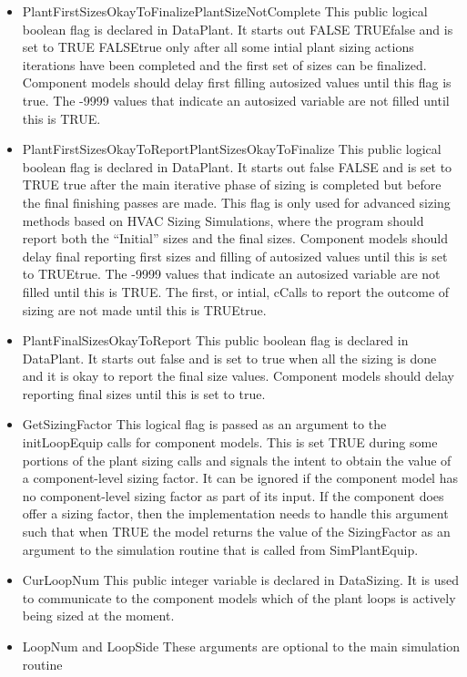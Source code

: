 \begin{itemize}
\item
  PlantFirstSizesOkayToFinalizePlantSizeNotComplete This public logical boolean flag is declared in DataPlant. It starts out FALSE TRUEfalse and is set to TRUE FALSEtrue only after all some intial plant sizing actions iterations have been completed and the first set of sizes can be finalized. Component models should delay first filling autosized values until this flag is true. The -9999 values that indicate an autosized variable are not filled until this is TRUE.
\item
  PlantFirstSizesOkayToReportPlantSizesOkayToFinalize This public logical boolean flag is declared in DataPlant. It starts out false FALSE and is set to TRUE true after the main iterative phase of sizing is completed but before the final finishing passes are made. This flag is only used for advanced sizing methods based on HVAC Sizing Simulations, where the program should report both the ``Initial'' sizes and the final sizes. Component models should delay final reporting first sizes and filling of autosized values until this is set to TRUEtrue. The -9999 values that indicate an autosized variable are not filled until this is TRUE. The first, or intial, cCalls to report the outcome of sizing are not made until this is TRUEtrue.
\item
  PlantFinalSizesOkayToReport This public boolean flag is declared in DataPlant. It starts out false and is set to true when all the sizing is done and it is okay to report the final size values. Component models should delay reporting final sizes until this is set to true.
\item
  GetSizingFactor This logical flag is passed as an argument to the initLoopEquip calls for component models. This is set TRUE during some portions of the plant sizing calls and signals the intent to obtain the value of a component-level sizing factor. It can be ignored if the component model has no component-level sizing factor as part of its input. If the component does offer a sizing factor, then the implementation needs to handle this argument such that when TRUE the model returns the value of the SizingFactor as an argument to the simulation routine that is called from SimPlantEquip.
\item
  CurLoopNum This public integer variable is declared in DataSizing. It is used to communicate to the component models which of the plant loops is actively being sized at the moment.
\item
  LoopNum and LoopSide These arguments are optional to the main simulation routine
\end{itemize}

